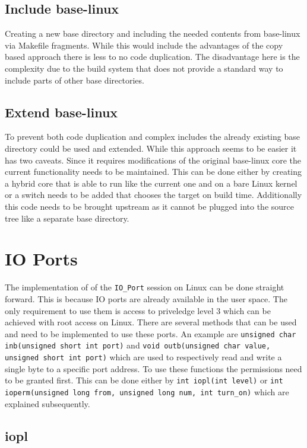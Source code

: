 \documentclass[
a4paper,
12pt,
notitlepage,
parskip=half,
DIV=11,
]{scrbook}
\begin{document}
		\subsection{Include base-linux}
		Creating a new base directory and including the needed contents from base-linux via Makefile fragments.
		While this would include the advantages of the copy based approach there is less to no code duplication.
		The disadvantage here is the complexity due to the build system that does not provide a standard way to include parts of other base directories.
	
		\subsection{Extend base-linux}
		To prevent both code duplication and complex includes the already existing base directory could be used and extended.
		While this approach seems to be easier it has two caveats.
		Since it requires modifications of the original base-linux core the current functionality needs to be maintained.
		This can be done either by creating a hybrid core that is able to run like the current one and on a bare Linux kernel or a switch needs to be added that chooses the target on build time.
		Additionally this code needs to be brought upstream as it cannot be plugged into the source tree like a separate base directory.
		
		\section{IO Ports}
		
		The implementation of of the \texttt{IO\_Port} session on Linux can be done straight forward.
		This is because IO ports are already available in the user space.
		The only requirement to use them is access to priveledge level 3 which can be achieved with root access on Linux.
		There are several methods that can be used and need to be implemented to use these ports.
		An example are \texttt{unsigned char inb(unsigned short int port)} and \texttt{void outb(unsigned char value, unsigned short int port)} which are used to respectively read and write a single byte to a specific port address.
		To use these functions the permissions need to be granted first.
		This can be done either by \texttt{int iopl(int level)} or \texttt{int ioperm(unsigned long from, unsigned long num, int turn\_on)} which are explained subsequently. \citep{outb} \citep{ioperm} \citep{iopl}
				
		\subsection{iopl}
		
\end{document}
